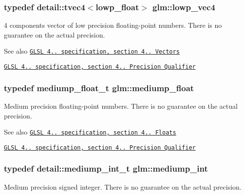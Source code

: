 \subsubsection[{lowp\+\_\+vec4}]{\setlength{\rightskip}{0pt plus 5cm}typedef detail\+::tvec4$<$lowp\+\_\+float$>$ {\bf glm\+::lowp\+\_\+vec4}}\label{group__core__precision_gabc7a12b5fe2a8b5b4d11961c284637dc}
4 components vector of low precision floating-\/point numbers. There is no guarantee on the actual precision.

\begin{DoxySeeAlso}{See also}
\href{http://www.opengl.org/registry/doc/GLSLangSpec.4.20.8.pdf}{\tt G\+L\+S\+L 4.. specification, section 4.. Vectors} 

\href{http://www.opengl.org/registry/doc/GLSLangSpec.4.20.8.pdf}{\tt G\+L\+S\+L 4.. specification, section 4.. Precision Qualifier} 
\end{DoxySeeAlso}
\hypertarget{group__core__precision_gac785826c039fe6c97c03b37c81c1a68e}{}
\subsubsection[{mediump\+\_\+float}]{\setlength{\rightskip}{0pt plus 5cm}typedef mediump\+\_\+float\+\_\+t {\bf glm\+::mediump\+\_\+float}}\label{group__core__precision_gac785826c039fe6c97c03b37c81c1a68e}
Medium precision floating-\/point numbers. There is no guarantee on the actual precision.

\begin{DoxySeeAlso}{See also}
\href{http://www.opengl.org/registry/doc/GLSLangSpec.4.20.8.pdf}{\tt G\+L\+S\+L 4.. specification, section 4.. Floats} 

\href{http://www.opengl.org/registry/doc/GLSLangSpec.4.20.8.pdf}{\tt G\+L\+S\+L 4.. specification, section 4.. Precision Qualifier} 
\end{DoxySeeAlso}
\hypertarget{group__core__precision_ga2a3dcbcd7f4e17663d393a12061ac6ac}{}
\subsubsection[{mediump\+\_\+int}]{\setlength{\rightskip}{0pt plus 5cm}typedef detail\+::mediump\+\_\+int\+\_\+t {\bf glm\+::mediump\+\_\+int}}\label{group__core__precision_ga2a3dcbcd7f4e17663d393a12061ac6ac}
Medium precision signed integer. There is no guarantee on the actual precision.

